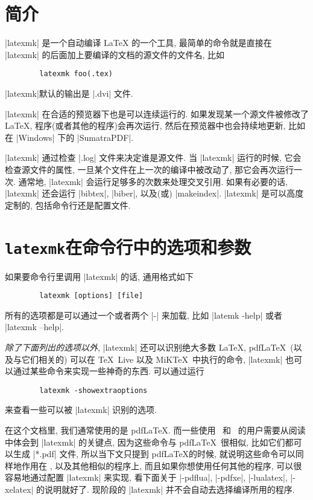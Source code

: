 \documentclass{ctexart}
\begin{document}
\DefineShortVerb{\|}
\section{简介}
    |latexmk| 是一个自动编译 \LaTeX{} 的一个工具, 最简单的命令就是直接在 |latexmk| 的后面加上要编译的文档的源文件的文件名, 比如
    \begin{Verbatim}
        latexmk foo(.tex)
    \end{Verbatim}
    |latexmk|默认的输出是 |.dvi| 文件.

    |latexmk| 在合适的预览器下也是可以连续运行的. 如果发现某一个源文件被修改了 \LaTeX{}, 程序(或者其他的程序)会再次运行, 然后在预览器中也会持续地更新, 比如在 |Windows| 下的 |SumatraPDF|.

    |latexmk| 通过检查 |.log| 文件来决定谁是源文件. 当 |latexmk| 运行的时候, 它会检查源文件的属性, 一旦某个文件在上一次的编译中被改动了, 那它会再次运行一次. 通常地,  |latexmk| 会运行足够多的次数来处理交叉引用. 如果有必要的话, |latexmk| 还会运行 |bibtex|, |biber|, 以及(或) |makeindex|. |latexmk| 是可以高度定制的, 包括命令行还是配置文件.

\section{\texttt{latexmk}在命令行中的选项和参数}
    如果要命令行里调用 |latexmk| 的话, 通用格式如下
    \begin{Verbatim}
        latexmk [options] [file]
    \end{Verbatim}
    所有的选项都是可以通过一个或者两个 |-| 来加载, 比如 |latemk -help| 或者 |latexmk --help|.
    \begin{Remark}
        \emph{除了下面列出的选项以外}, |latexmk| 还可以识别绝大多数 \LaTeX, pdf\LaTeX\ (以及与它们相关的) 可以在 \TeX\ Live 以及 MiK\TeX\ 中执行的命令, |latexmk| 也可以通过某些命令来实现一些神奇的东西. 可以通过运行
    \begin{Verbatim}
        latexmk -showextraoptions
    \end{Verbatim}
        来查看一些可以被 |latexmk| 识别的选项.
    \end{Remark}
    \begin{Remark}
        在这个文档里, 我们通常使用的是 pdf\LaTeX. 而一些使用 \LuaLaTeX\ 和 \XeLaTeX\ 的用户需要从阅读中体会到 |latexmk| 的关键点, 因为这些命令与 pdf\LaTeX\ 很相似, 比如它们都可以生成 |*.pdf| 文件, 所以当下文只提到 pdf\LaTeX 的时候, 就说明这些命令可以同样地作用在 \XeLaTeX, \LuaLaTeX 以及其他相似的程序上, 而且如果你想使用任何其他的程序, 可以很容易地通过配置 |latexmk| 来实现, 看下面关于 |-pdflua|, |-pdfxe|, |-lualatex|, |-xelatex| 的说明就好了. 现阶段的 |latexmk| 并不会自动去选择编译所用的程序.
    \end{Remark}
\end{document}
